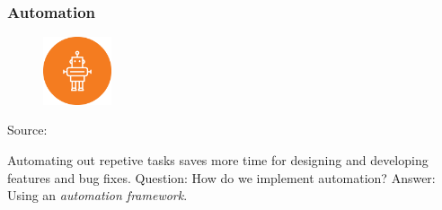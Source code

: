 \begin{frame}
  \frametitle{Automation}
  \begin{figure}[htpb]
      \centering
      \includegraphics[width=2cm]{images/robot-icon.eps}
  \end{figure}
  \begin{center}
  {\tiny Source: \cite{robot_icon}}
  \end{center}

  Automating out repetive tasks saves more time for designing and developing features and bug fixes.
  \newline
  \newline
  Question: How do we implement automation?
  \pause
  \newline
  \newline
  Answer: Using an {\it automation framework}.

\end{frame}

